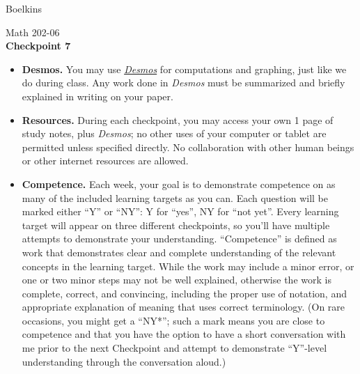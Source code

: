 \documentclass[11 pt]{article}
\begin{document}
 \hfill Boelkins \\
 
\begin{center}
Math 202-06 \\
{\bf Checkpoint 7}
\end{center}



\begin{itemize}
	
	\item {\bf Desmos.} You may use \href{https://www.desmos.com/calculator}{\emph{Desmos}} for computations and graphing, just like we do during class.  Any work done in \emph{Desmos} must be summarized and briefly explained in writing on your paper.  
	
	\item {\bf Resources.} During each checkpoint, you may access your own 1 page of study notes, plus \emph{Desmos}; no other uses of your computer or tablet are permitted unless specified directly.  No collaboration with other human beings or other internet resources are allowed.
	
	
	\item {\bf Competence.} Each week, your goal is to demonstrate competence on as many of the included learning targets as you can.  Each question will be marked either ``Y'' or ``NY'': Y for ``yes'', NY for ``not yet''.  Every learning target will appear on three different checkpoints, so you'll have multiple attempts to demonstrate your understanding.  ``Competence'' is defined as work that demonstrates clear and complete understanding of the relevant concepts in the learning target. While the work may include a minor error, or one or two minor steps may not be well explained, otherwise the work is complete, correct, and convincing, including the proper use of notation, and appropriate explanation of meaning that uses correct terminology.  (On rare occasions, you might get a ``NY*''; such a mark means you are close to competence and that you have the option to have a short conversation with me prior to the next Checkpoint and attempt to demonstrate ``Y''-level understanding through the conversation aloud.)	
\end{itemize}

\noindent \hrulefill \\
\end{document}
